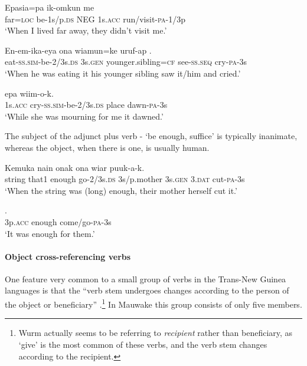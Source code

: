 \ea%
\label{ex:3:x305}
\gll Epasia=pa ik-omkun me   \\
far=\textsc{loc} be-1s/p.\textsc{ds} NEG 1s.\textsc{acc} run/visit-\textsc{pa}-1/3p\\
\glt`When I lived far away, they didn't visit me.'
\z

\ea%
\label{ex:3:x1059}
\gll En-em-ika-eya ona wiamun=ke uruf-ap .\\
eat-\textsc{ss}.\textsc{sim}-be-2/3s.\textsc{ds} 3s.\textsc{gen} younger.sibling=\textsc{cf} see-\textsc{ss}.\textsc{seq} cry-\textsc{pa}-3s\\
\glt`When he was eating it his younger sibling saw it/him and cried.'
\z

\ea%
\label{ex:3:x1060}
\gll {}  epa wiim-o-k. \\
1s.\textsc{acc} cry-\textsc{ss}.\textsc{sim}-be-2/3s.\textsc{ds} place dawn-\textsc{pa}-3s\\
\glt`While she was mourning for me it dawned.'
\z

The subject of the adjunct plus verb - `be enough, suffice' is typically inanimate, whereas the object, when there is one, is usually human. 

\ea%
\label{ex:3:x1058}
\gll Kemuka nain   onak ona wiar puuk-a-k.\\
string that1 enough go-2/3s.\textsc{ds} 3s/p.mother 3s.\textsc{gen} 3.\textsc{dat} cut-\textsc{pa}-3s\\
\glt`When the string was (long) enough, their mother herself cut it.'
\z

\ea%
\label{ex:3:x306}
\gll {}  . \\
3p.\textsc{acc} enough come/go-\textsc{pa}-3s \\
\glt`It was enough for them.'
\z

\paragraph{Object cross-referencing verbs}\label{sec:3:a:z:y:x}
{}
One feature very common to a small group of verbs in the Trans-New Guinea languages is that the ``{verb stem undergoes changes according to the person of the object or beneficiary}'' \citep[62]{Wurm1982}.\footnote{Wurm actually seems to be referring to \textit{recipient} rather than beneficiary, as `give' is the most common of these verbs, and the verb stem changes according to the recipient.} In Mauwake this group consists of only five members. 

